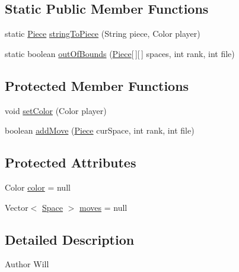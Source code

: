 \subsection*{Static Public Member Functions}
\begin{DoxyCompactItemize}
\item 
static \hyperlink{class_piece}{Piece} \hyperlink{class_piece_aa6ae6ab5e1f16bdb941f9798362b3c66}{string\-To\-Piece} (String piece, Color player)
\item 
static boolean \hyperlink{class_piece_a6aecb3265f4e0f344ee0a2f57d1a1ae4}{out\-Of\-Bounds} (\hyperlink{class_piece}{Piece}\mbox{[}$\,$\mbox{]}\mbox{[}$\,$\mbox{]} spaces, int rank, int file)
\end{DoxyCompactItemize}
\subsection*{Protected Member Functions}
\begin{DoxyCompactItemize}
\item 
void \hyperlink{class_piece_aa9ea4ff0dd0e931fc3ad928233fbd281}{set\-Color} (Color player)
\item 
boolean \hyperlink{class_piece_a9dfc2ca9c8375ca29deb561255c4ce9b}{add\-Move} (\hyperlink{class_piece}{Piece} cur\-Space, int rank, int file)
\end{DoxyCompactItemize}
\subsection*{Protected Attributes}
\begin{DoxyCompactItemize}
\item 
Color \hyperlink{class_piece_ac3be06c38af4366f18cef94594a30a0d}{color} = null
\item 
Vector$<$ \hyperlink{class_space}{Space} $>$ \hyperlink{class_piece_a6fb158d95f588f706ae716b13487ba10}{moves} = null
\end{DoxyCompactItemize}


\subsection{Detailed Description}
\begin{DoxyAuthor}{Author}
Will 
\end{DoxyAuthor}


